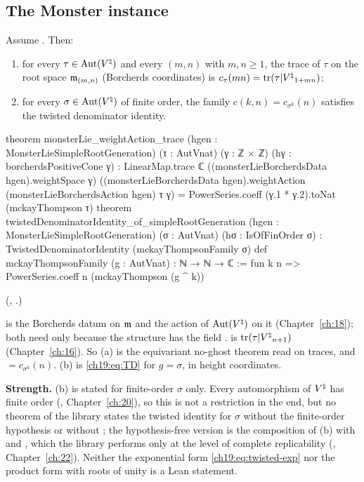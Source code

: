\subsection{The Monster instance}

\begin{theorem}\label{ch19:thm:twistedmonster}
Assume .  Then:
\begin{enumerate}[label=(\alph*)]
\item for every $\tau\in\operatorname{Aut}({V^{\natural}})$ and every $(m,n)$ with $m,n\ge1$, the trace of $\tau$ on the root space $\mathfrak{m}_{(m,n)}$ (Borcherds
  coordinates) is $c_\tau(mn)=\operatorname{tr}(\tau|{V^{\natural}}_{1+mn})$;
\item for every $\sigma\in\operatorname{Aut}({V^{\natural}})$ of finite order, the family $c(k,n)=c_{\sigma^k}(n)$ satisfies the twisted denominator identity.
\end{enumerate}
\end{theorem}
\begin{leancode}
theorem monsterLie_weightAction_trace (hgen : MonsterLieSimpleRootGeneration) (τ : AutVnat)
    (γ : ℤ × ℤ) (hγ : borcherdsPositiveCone γ) :
    LinearMap.trace ℂ ((monsterLieBorcherdsData hgen).weightSpace γ)
        ((monsterLieBorcherdsData hgen).weightAction (monsterLieBorcherdsAction hgen) τ γ) =
      PowerSeries.coeff (γ.1 * γ.2).toNat (mckayThompson τ)
theorem twistedDenominatorIdentity_of_simpleRootGeneration (hgen : MonsterLieSimpleRootGeneration)
    (σ : AutVnat) (hσ : IsOfFinOrder σ) : TwistedDenominatorIdentity (mckayThompsonFamily σ)
def mckayThompsonFamily (g : AutVnat) : ℕ → ℕ → ℂ :=
  fun k n => PowerSeries.coeff n (mckayThompson (g ^ k))
\end{leancode}
(, .)
\begin{dictionary}
 is the Borcherds datum on $\mathfrak{m}$ and  the action of
$\operatorname{Aut}({V^{\natural}})$ on it (Chapter~\ref{ch:18}); both need  only because the structure  has the field
.   is $\operatorname{tr}(\tau|{V^{\natural}}_{n+1})$ (Chapter~\ref{ch:16}).  So (a) is the
equivariant no-ghost theorem read on traces, and  $=c_{\sigma^k}(n)$.  (b) is
\eqref{ch19:eq:TD} for $g=\sigma$, in height coordinates.

\textbf{Strength.}  (b) is stated for finite-order $\sigma$ only.  Every automorphism of ${V^{\natural}}$ has finite order
(, Chapter~\ref{ch:20}), so this is not a restriction in the end, but no theorem of the library
states the twisted identity for $\sigma$ without the finite-order hypothesis or without ; the hypothesis-free
version is the composition of (b) with  and , which
the library performs only at the level of complete replicability (, Chapter~\ref{ch:22}).
Neither the exponential form \eqref{ch19:eq:twisted-exp} nor the product form with roots of unity is a Lean statement.
\end{dictionary}
